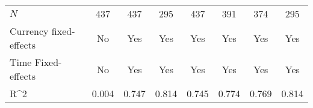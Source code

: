 \begin{table}[H]
\begin{adjustbox}{max width=\textwidth}
\begin{tabular}{l*{7}{c}}
\midrule
\(N\)       &         437         &         437         &         295         &         437         &         391         &         374         &         295         \\
Currency fixed-effects&          No         &         Yes         &         Yes         &         Yes         &         Yes         &         Yes         &         Yes         \\
Time Fixed-effects&          No         &         Yes         &         Yes         &         Yes         &         Yes         &         Yes         &         Yes         \\
R^{2}       &       0.004         &       0.747         &       0.814         &       0.745         &       0.774         &       0.769         &       0.814         \\
\bottomrule \end{tabular} \end{adjustbox}          \footnotesize \item  \end{table}

